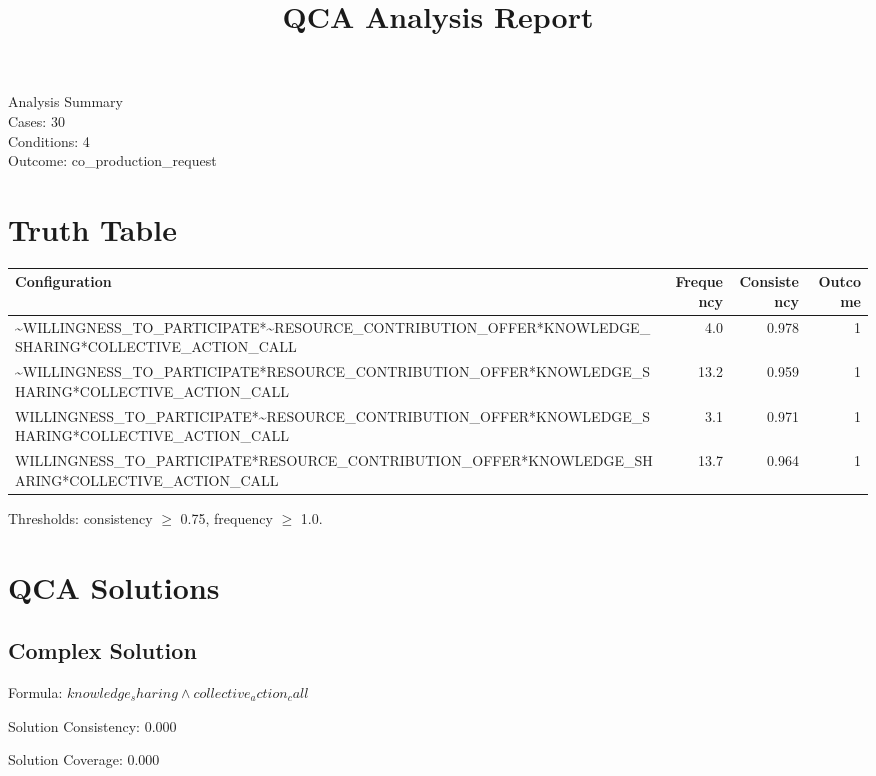 \documentclass[12pt,a4paper]{article}
\title{QCA Analysis Report}
\begin{document}
\maketitle
\begin{center}
\large
Analysis Summary \\
Cases: 30 \\
Conditions: 4 \\
Outcome: co\_production\_request
\end{center}
\newpage

\tableofcontents

\newpage


\section{Truth Table}
\begin{longtable}{lrrr}
\toprule
Configuration & Frequency & Consistency & Outcome \\
\midrule
    \textasciitilde{}WILLINGNESS\_TO\_PARTICIPATE*\textasciitilde{}RESOURCE\_CONTRIBUTION\_OFFER*KNOWLEDGE\_SHARING*COLLECTIVE\_ACTION\_CALL & 4.0 & 0.978 & 1 \\
    \textasciitilde{}WILLINGNESS\_TO\_PARTICIPATE*RESOURCE\_CONTRIBUTION\_OFFER*KNOWLEDGE\_SHARING*COLLECTIVE\_ACTION\_CALL & 13.2 & 0.959 & 1 \\
    WILLINGNESS\_TO\_PARTICIPATE*\textasciitilde{}RESOURCE\_CONTRIBUTION\_OFFER*KNOWLEDGE\_SHARING*COLLECTIVE\_ACTION\_CALL & 3.1 & 0.971 & 1 \\
    WILLINGNESS\_TO\_PARTICIPATE*RESOURCE\_CONTRIBUTION\_OFFER*KNOWLEDGE\_SHARING*COLLECTIVE\_ACTION\_CALL & 13.7 & 0.964 & 1 \\
\bottomrule
\end{longtable}

Thresholds: consistency $\geq$ 0.75, frequency $\geq$ 1.0.


\section{QCA Solutions}

\subsection{Complex Solution}

Formula: $\displaystyle knowledge_sharing \land collective_action_call$

Solution Consistency: 0.000

Solution Coverage: 0.000
\end{document}
